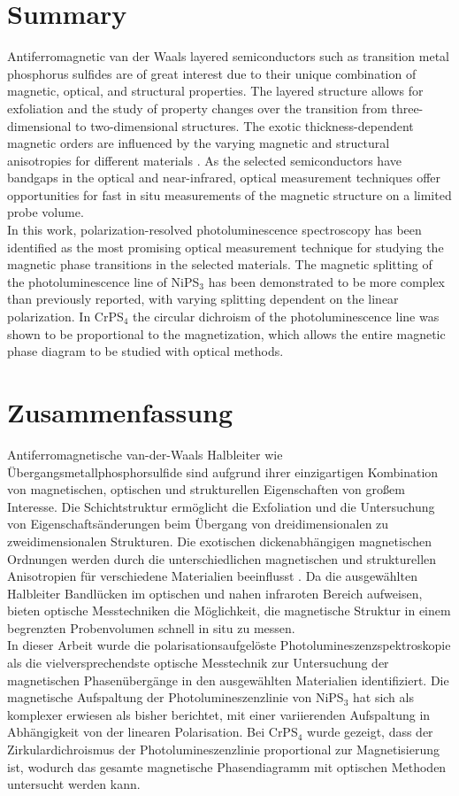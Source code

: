 \documentclass[
	twoside,
	parskip=half,
	a4paper,
]{scrbook}
\begin{document}
\section*{Summary}
Antiferromagnetic van der Waals layered semiconductors such as transition metal phosphorus sulfides are of great interest due to their unique combination of magnetic, optical, and structural properties. 
The layered structure allows for exfoliation and the study of property changes over the transition from three-dimensional to two-dimensional structures.
The exotic thickness-dependent magnetic orders \cite{AFM_review} are influenced by the varying magnetic and structural anisotropies for different materials \cite{MPS_magnetism, CrPS4_magnetic}.
As the selected semiconductors have bandgaps in the optical and near-infrared, optical measurement techniques offer opportunities for fast in situ measurements of the magnetic structure on a limited probe volume.\\
In this work, polarization-resolved photoluminescence spectroscopy has been identified as the most promising optical measurement technique for studying the magnetic phase transitions in the selected materials.
The magnetic splitting of the photoluminescence line of NiPS$_3$ has been demonstrated to be more complex than previously reported, with varying splitting dependent on the linear polarization.
In CrPS$_4$ the circular dichroism of the photoluminescence line was shown to be proportional to the magnetization, which allows the entire magnetic phase diagram to be studied with optical methods.

\vfill
\section*{Zusammenfassung}
Antiferromagnetische van-der-Waals Halbleiter wie Übergangsmetallphosphorsulfide sind aufgrund ihrer einzigartigen Kombination von magnetischen, optischen und strukturellen Eigenschaften von großem Interesse. 
Die Schichtstruktur ermöglicht die Exfoliation und die Untersuchung von Eigenschaftsänderungen beim Übergang von dreidimensionalen zu zweidimensionalen Strukturen.
Die exotischen dickenabhängigen magnetischen Ordnungen \cite{AFM_review} werden durch die unterschiedlichen magnetischen und strukturellen Anisotropien für verschiedene Materialien beeinflusst \cite{MPS_magnetism, CrPS4_magnetic}.
Da die ausgewählten Halbleiter Bandlücken im optischen und nahen infraroten Bereich aufweisen, bieten optische Messtechniken die Möglichkeit, die magnetische Struktur in einem begrenzten Probenvolumen schnell in situ zu messen.\\
In dieser Arbeit wurde die polarisationsaufgelöste Photolumineszenzspektroskopie als die vielversprechendste optische Messtechnik zur Untersuchung der magnetischen Phasenübergänge in den ausgewählten Materialien identifiziert.
Die magnetische Aufspaltung der Photolumineszenzlinie von NiPS$_3$ hat sich als komplexer erwiesen als bisher berichtet, mit einer variierenden Aufspaltung in Abhängigkeit von der linearen Polarisation.
Bei CrPS$_4$ wurde gezeigt, dass der Zirkulardichroismus der Photolumineszenzlinie proportional zur Magnetisierung ist, wodurch das gesamte magnetische Phasendiagramm mit optischen Methoden untersucht werden kann.
\vfill
\end{document}
